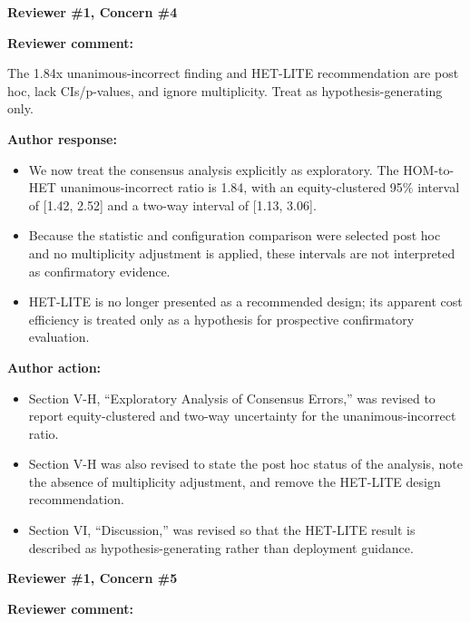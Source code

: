 \documentclass[11pt]{article}
\newcommand{\rvcomment}[1]{{\color{ReviewerGreen}#1}}
\newcommand{\concern}[1]{\textbf{\color{ReviewerGreen}#1}}
\begin{document}
\vspace{12pt}
\concern{Reviewer \#1, Concern \#4}

\concern{Reviewer comment:}

\rvcomment{The 1.84x unanimous-incorrect finding and HET-LITE recommendation are post hoc, lack CIs/p-values, and ignore multiplicity. Treat as hypothesis-generating only.}

\textbf{Author response:}

\begin{itemize}

\item We now treat the consensus analysis explicitly as exploratory. The HOM-to-HET unanimous-incorrect ratio is 1.84, with an equity-clustered 95\% interval of [1.42, 2.52] and a two-way interval of [1.13, 3.06].

\item Because the statistic and configuration comparison were selected post hoc and no multiplicity adjustment is applied, these intervals are not interpreted as confirmatory evidence.

\item HET-LITE is no longer presented as a recommended design; its apparent cost efficiency is treated only as a hypothesis for prospective confirmatory evaluation.

\end{itemize}

\textbf{Author action:}

\begin{itemize}

\item Section V-H, ``Exploratory Analysis of Consensus Errors,'' was revised to report equity-clustered and two-way uncertainty for the unanimous-incorrect ratio.

\item Section V-H was also revised to state the post hoc status of the analysis, note the absence of multiplicity adjustment, and remove the HET-LITE design recommendation.

\item Section VI, ``Discussion,'' was revised so that the HET-LITE result is described as hypothesis-generating rather than deployment guidance.

\end{itemize}

\vspace{12pt}
\concern{Reviewer \#1, Concern \#5}

\concern{Reviewer comment:}
\end{document}
